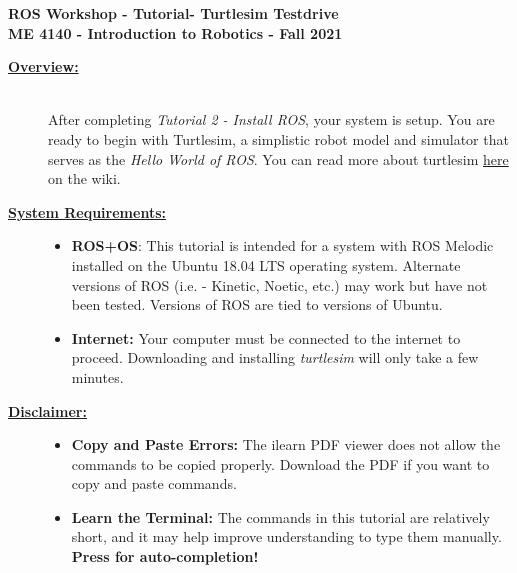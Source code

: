 \documentclass[12pt]{article}
\newcommand{\MNUM}{3} %
\newcommand{\MNAME}{Turtlesim Testdrive} %
\begin{document}
\thispagestyle{plain}

\begin{center}
   {\bf \Large ROS Workshop - Tutorial\hspc\MNUM\hspc - \MNAME}\vspace{3mm}\\
   {\bf \large ME 4140 - Introduction to Robotics - Fall 2021} \vspace{5mm}\\
\end{center}

\begin{description}

\item[\textbf{\underline{Overview:}}] \hfill \vspace{3mm}\\
After completing {\it Tutorial 2 - Install ROS}, your system is setup. You are ready to begin with Turtlesim, a simplistic robot model and simulator that serves as the {\it Hello World of ROS}. You can read more about turtlesim \href{http://wiki.ros.org/turtlesim}{here} on the wiki. 

\item[\textbf{\underline{System Requirements:}}] \hfill \vspace{0mm}

\begin{itemize}
	\item {\bf ROS+OS}: This tutorial is intended for a system with ROS Melodic installed on the Ubuntu 18.04 LTS operating system. Alternate versions of ROS (i.e. - Kinetic, Noetic, etc.) may work but have not been tested. Versions of ROS are tied to versions of Ubuntu.
	\item {\bf Internet:} Your computer must be connected to the internet to proceed. Downloading and installing {\it turtlesim} will only take a few minutes.
\end{itemize}

\item[\textbf{\underline{Disclaimer:}}] \hfill \vspace{0mm}

\begin{itemize}
	\item {\bf\RD Copy and Paste Errors:} {\RD The ilearn PDF viewer does not allow the commands to be copied properly. Download the PDF if you want to copy and paste commands.} 
	
	\item {\bf Learn the Terminal:} The commands in this tutorial are relatively short, and it may help improve understanding to type them manually. {\bf Press \TABKey for auto-completion!}
	

\end{itemize}
\end{description}
\end{document}
